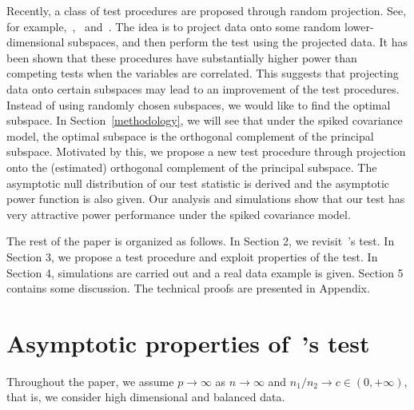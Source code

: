 \documentclass[review]{elsarticle}
\theoremstyle{plain}
\theoremstyle{definition}
\theoremstyle{remark}
\begin{document}
Recently, a class of test procedures are proposed through random projection.
See, for example,~\cite{Lopes2015A},~\cite{Thulin2014A} and~\cite{Srivastava2014RAPTT}.
The idea is to project data onto some random lower-dimensional subspaces, and then perform the test using the projected data.
It has been shown that these procedures have substantially higher power than competing tests when the variables are correlated. 
This suggests that projecting data onto certain subspaces may lead to an improvement of the test procedures.
Instead of using randomly chosen subspaces, we would like to find the optimal subspace.
In Section~\ref{methodology}, we will see that under the spiked covariance model, the optimal subspace is the orthogonal complement of the principal subspace.
Motivated by this, we propose a new test procedure through projection onto the (estimated) orthogonal complement of the principal subspace.  
The asymptotic null distribution of our test statistic is derived and the asymptotic power function is also given.
Our analysis and simulations show that our test has very attractive power performance under the spiked covariance model.




The rest of the paper is organized as follows. In Section 2,  we revisit~\cite{Chen2010A}'s test.  In Section 3, we propose a test procedure and exploit properties of the test.  In Section 4, simulations are carried out and  a real data example is given. Section 5 contains some discussion. The technical proofs are presented in Appendix.

\section{Asymptotic properties of~\cite{Chen2010A}'s test}\label{sec:chen}
    Throughout the paper, we  assume $p\to \infty$ as $n\to \infty$ and ${n_1}/{n_2}\to c \in (0,+\infty)$, that is, we consider high dimensional and balanced data.
\end{document}
